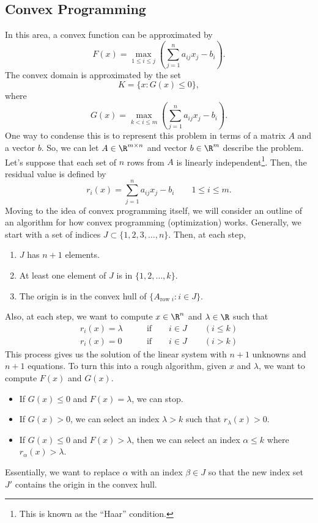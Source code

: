 \documentclass[letterpaper]{article}
\begin{document}
\subsection{Convex Programming}
In this area, a convex function can be approximated by 
\[F(x) = \max_{1 \leq i \leq j} \left(\sum_{j = 1}^{n} a_{ij} x_j - b_i\right).\]
The convex domain is approximated by the set \[K = \{x : G(x) \leq 0\},\] where \[G(x) = \max_{k < i \leq m} \left(\sum_{j = 1}^{n} a_{ij}x_j - b_i\right).\]
One way to condense this is to represent this problem in terms of a matrix $A$ and a vector $b$. So, we can let $A \in \R^{m \times n}$ and vector $b \in \R^m$ describe the problem. Let's suppose that each set of $n$ rows from $A$ is linearly independent\footnote{This is known as the ``Haar'' condition.}. Then, the residual value is defined by \[r_{i}(x) = \sum_{j = 1}^{n} a_{ij} x_{j} - b_{i} \qquad 1 \leq i \leq m.\]
Moving to the idea of convex programming itself, we will consider an outline of an algorithm for how convex programming (optimization) works. Generally, we start with a set of indices $J \subset \{1, 2, 3, \hdots, n\}$. Then, at each step, 
\begin{enumerate}
    \item $J$ has $n + 1$ elements. 
    \item At least one element of $J$ is in $\{1, 2, \hdots, k\}$. 
    \item The origin is in the convex hull of $\{A_{\text{row } i} : i \in J\}.$
\end{enumerate}
Also, at each step, we want to compute $x \in \R^n$ and $\lambda \in \R$ such that 
\[\begin{aligned}
    r_{i}(x) = \lambda \qquad &\text{if} \qquad i \in J \qquad (i \leq k) \\ 
    r_{i}(x) = 0 \qquad &\text{if} \qquad i \in J \qquad (i > k)
\end{aligned}\]
This process gives us the solution of the linear system with $n + 1$ unknowns and $n + 1$ equations. To turn this into a rough algorithm, given $x$ and $\lambda$, we want to compute $F(x)$ and $G(x)$.
\begin{itemize}
    \item If $G(x) \leq 0$ and $F(x) = \lambda$, we can stop.
    \item If $G(x) > 0$, we can select an index $\lambda > k$ such that $r_{\lambda}(x) > 0$.
    \item If $G(x) \leq 0$ and $F(x) > \lambda$, then we can select an index $\alpha \leq k$ where $r_{\alpha}(x) > \lambda$. 
\end{itemize} 
Essentially, we want to replace $\alpha$ with an index $\beta \in J$ so that the new index set $J'$ contains the origin in the convex hull.
\end{document}
